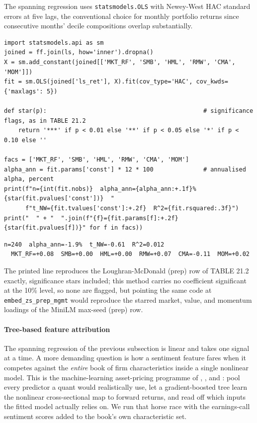 The spanning regression uses \texttt{statsmodels.OLS} with Newey-West HAC standard errors at five lags, the conventional choice for monthly portfolio returns since consecutive months' decile compositions overlap substantially.

\begin{verbatim}
import statsmodels.api as sm
joined = ff.join(ls, how='inner').dropna()
X = sm.add_constant(joined[['MKT_RF', 'SMB', 'HML', 'RMW', 'CMA', 'MOM']])
fit = sm.OLS(joined['ls_ret'], X).fit(cov_type='HAC', cov_kwds={'maxlags': 5})

def star(p):                                            # significance flags, as in TABLE 21.2
    return '***' if p < 0.01 else '**' if p < 0.05 else '*' if p < 0.10 else ''

facs = ['MKT_RF', 'SMB', 'HML', 'RMW', 'CMA', 'MOM']
alpha_ann = fit.params['const'] * 12 * 100              # annualised alpha, percent
print(f"n={int(fit.nobs)}  alpha_ann={alpha_ann:+.1f}%{star(fit.pvalues['const'])}  "
      f"t_NW={fit.tvalues['const']:+.2f}  R^2={fit.rsquared:.3f}")
print("  " + "  ".join(f"{f}={fit.params[f]:+.2f}{star(fit.pvalues[f])}" for f in facs))
\end{verbatim}

\begin{verbatim}
n=240  alpha_ann=-1.9%  t_NW=-0.61  R^2=0.012
  MKT_RF=+0.08  SMB=+0.00  HML=+0.00  RMW=+0.07  CMA=-0.11  MOM=+0.02
\end{verbatim}

The printed line reproduces the Loughran-McDonald (prep) row of TABLE 21.2 exactly, significance stars included; this method carries no coefficient significant at the 10\% level, so none are flagged, but pointing the same code at \texttt{embed\_zs\_prep\_mgmt} would reproduce the starred market, value, and momentum loadings of the MiniLM max-seed (prep) row.

\paragraph{Tree-based feature attribution}

The spanning regression of the previous subsection is linear and takes one signal at a time. A more demanding question is how a sentiment feature fares when it competes against the \textit{entire} book of firm characteristics inside a single nonlinear model. This is the machine-learning asset-pricing programme of \cite{gu2018empirical}, \cite{freyberger2020dissecting}, and \cite{nagel2021machine}: pool every predictor a quant would realistically use, let a gradient-boosted tree learn the nonlinear cross-sectional map to forward returns, and read off which inputs the fitted model actually relies on. We run that horse race with the earnings-call sentiment scores added to the book's own characteristic set.

